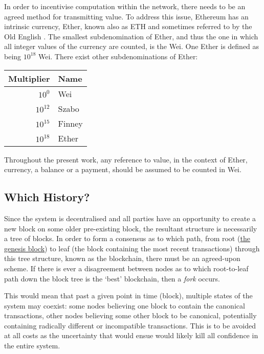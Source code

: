 \documentclass[9pt,oneside]{amsart}
\begin{document}
\begin{multicols}{2}
In order to incentivise computation within the network, there needs to be an agreed method for transmitting value. To address this issue, Ethereum has an intrinsic currency, Ether, known also as {\small ETH} and sometimes referred to by the Old English \DH{}. The smallest subdenomination of Ether, and thus the one in which all integer values of the currency are counted, is the Wei. One Ether is defined as being $10^{18}$ Wei. There exist other subdenominations of Ether:
\par
\begin{center}
\begin{tabular}{rl}
\toprule
Multiplier & Name \\
\midrule
$10^0$ & Wei \\
$10^{12}$ & Szabo \\
$10^{15}$ & Finney \\
$10^{18}$ & Ether \\
\bottomrule
\end{tabular}
\end{center}
\par

Throughout the present work, any reference to value, in the context of Ether, currency, a balance or a payment, should be assumed to be counted in Wei.

\subsection{Which History?}

Since the system is decentralised and all parties have an opportunity to create a new block on some older pre-existing block, the resultant structure is necessarily a tree of blocks. In order to form a consensus as to which path, from root (\hyperlink{Genesis_Block}{the genesis block}) to leaf (the block containing the most recent transactions) through this tree structure, known as the blockchain, there must be an agreed-upon scheme. If there is ever a disagreement between nodes as to which root-to-leaf path down the block tree is the `best' blockchain, then a \textit{fork} occurs.

This would mean that past a given point in time (block), multiple states of the system may coexist: some nodes believing one block to contain the canonical transactions, other nodes believing some other block to be canonical, potentially containing radically different or incompatible transactions. This is to be avoided at all costs as the uncertainty that would ensue would likely kill all confidence in the entire system.


\end{multicols}
\end{document}
